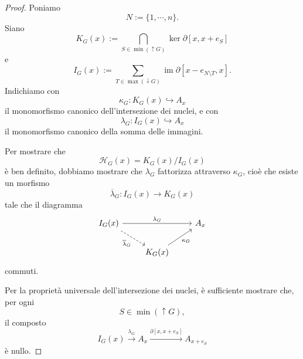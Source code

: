\documentclass[a4paper]{article}
\DeclareMathOperator{\im}{im}
\begin{document}
\begin{proof}
    Poniamo
    \[
        N := \{1,\cdots,n\}.
    \]
    Siano
    \[
        K_G(x)
        :=
        \bigcap_{S\in \min(\uparrow G)}
        \ker \partial[x,x+e_S]
    \]
    e
    \[
        I_G(x)
        :=
        \sum_{T\in \max(\downarrow G)}
        \im \partial[x-e_{N\setminus T},x].
    \]
    Indichiamo con
    \[
        \kappa_G \colon K_G(x) \hookrightarrow A_x
    \]
    il monomorfismo canonico dell'intersezione dei nuclei, e con
    \[
        \lambda_G \colon I_G(x) \hookrightarrow A_x
    \]
    il monomorfismo canonico della somma delle immagini.

    Per mostrare che
    \[
        \mathcal H_G(x)
        =
        K_G(x)/I_G(x)
    \]
    è ben definito, dobbiamo mostrare che \(\lambda_G\) fattorizza attraverso
    \(\kappa_G\), cioè che esiste un morfismo
    \[
        \overline{\lambda}_G \colon I_G(x)\to K_G(x)
    \]
    tale che il diagramma
    \[
        \begin{tikzcd}
            I_G(x) \arrow[rr, "\lambda_G"] \arrow[rd, "\overline{\lambda}_G"', dashed] & & A_x \\
            & K_G(x) \arrow[ru, "\kappa_G"'] &
        \end{tikzcd}
    \]
    commuti.

    Per la proprietà universale dell'intersezione dei nuclei, è sufficiente
    mostrare che, per ogni
    \[
        S\in \min(\uparrow G),
    \]
    il composto
    \[
        I_G(x)
        \xrightarrow{\lambda_G}
        A_x
        \xrightarrow{\partial[x,x+e_S]}
        A_{x+e_S}
    \]
    è nullo.


\end{proof}
\end{document}
